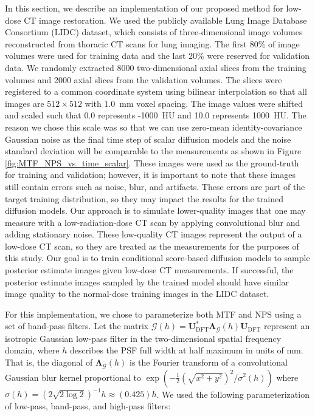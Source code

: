 \documentclass[12pt,]{article}
\begin{document}
In this section, we describe an implementation of our proposed method for low-dose CT image restoration. We used the publicly available Lung Image Database Consortium (LIDC) dataset, which consists of three-dimensional image volumes reconstructed from thoracic CT scans for lung imaging. The first 80\% of image volumes were used for training data and the last 20\% were reserved for validation data. We randomly extracted 8000 two-dimensional axial slices from the training volumes and 2000 axial slices from the validation volumes. The slices were registered to a common coordinate system using bilinear interpolation so that all images are $512\times512$ with $1.0$~mm voxel spacing. The image values were shifted and scaled such that 0.0 represents -1000~HU and 10.0 represents 1000~HU. The reason we chose this scale was so that we can use zero-mean identity-covariance Gaussian noise as the final time step of scalar diffusion models and the noise standard deviation will be comparable to the measurements as shown in Figure \ref{fig:MTF_NPS_vs_time_scalar}.  These images were used as the ground-truth for training and validation; however, it is important to note that these images still contain errors such as noise, blur, and artifacts. These errors are part of the target training distribution, so they may impact the results for the trained diffusion models. Our approach is to simulate lower-quality images that one may measure with a low-radiation-dose CT scan by applying convolutional blur and adding stationary noise. These low-quality CT images represent the output of a low-dose CT scan, so they are treated as the measurements for the purposes of this study. Our goal is to train conditional score-based diffusion models to sample posterior estimate images given low-dose CT measurements. If successful, the posterior estimate images sampled by the trained model should have similar image quality to the normal-dose training images in the LIDC dataset. 


For this implementation, we chose to parameterize both MTF and NPS using a set of band-pass filters.  Let the matrix $\boldsymbol{\mathcal{G}}(h) =  \mathbf{U}^*_\text{DFT} \boldsymbol{\Lambda}_{\boldsymbol{\mathcal{G}}}(h) \mathbf{U}_\text{DFT}$ represent an isotropic Gaussian low-pass filter in the two-dimensional spatial frequency domain, where $h$ describes the PSF full width at half maximum in units of $\text{mm}$.  That is, the diagonal of $\boldsymbol{\Lambda}_{\boldsymbol{\mathcal{G}}}(h)$ is the Fourier transform of a convolutional Gaussian blur kernel proportional to $\exp{(-\frac{1}{2} (\sqrt{x^2 + y^2})^2 / \sigma^2(h))}$ where $\sigma(h)=(2\sqrt{2\log{2}})^{-1}h \approx (0.425) h$.  We used the following parameterization of low-pass, band-pass, and high-pass filters:
\end{document}
